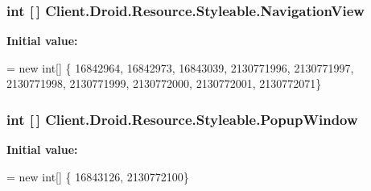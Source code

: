 \subsubsection[{Navigation\+View}]{\setlength{\rightskip}{0pt plus 5cm}int \mbox{[}$\,$\mbox{]} Client.\+Droid.\+Resource.\+Styleable.\+Navigation\+View\hspace{0.3cm}{\ttfamily [static]}}\label{classClient_1_1Droid_1_1Resource_1_1Styleable_a5937cedcaa4ac84fb292ee6bba0575bb}
{\bfseries Initial value\+:}
\begin{DoxyCode}
= \textcolor{keyword}{new} \textcolor{keywordtype}{int}[]
            \{
                    16842964,
                    16842973,
                    16843039,
                    2130771996,
                    2130771997,
                    2130771998,
                    2130771999,
                    2130772000,
                    2130772001,
                    2130772071\}
\end{DoxyCode}
\hypertarget{classClient_1_1Droid_1_1Resource_1_1Styleable_ad90b5b163a877268048533c1bec7860f}{}
\subsubsection[{Popup\+Window}]{\setlength{\rightskip}{0pt plus 5cm}int \mbox{[}$\,$\mbox{]} Client.\+Droid.\+Resource.\+Styleable.\+Popup\+Window\hspace{0.3cm}{\ttfamily [static]}}\label{classClient_1_1Droid_1_1Resource_1_1Styleable_ad90b5b163a877268048533c1bec7860f}
{\bfseries Initial value\+:}
\begin{DoxyCode}
= \textcolor{keyword}{new} \textcolor{keywordtype}{int}[]
            \{
                    16843126,
                    2130772100\}
\end{DoxyCode}
\hypertarget{classClient_1_1Droid_1_1Resource_1_1Styleable_a8709507c3df7d6d86362713aa746799a}{}
